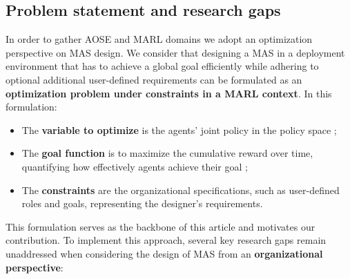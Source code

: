 \documentclass[pdflatex,sn-mathphys-num]{sn-jnl}%
\theoremstyle{thmstyleone}%
\theoremstyle{thmstyletwo}%
\theoremstyle{thmstylethree}%
\begin{document}

\subsection{Problem statement and research gaps}

In order to gather AOSE and MARL domains we adopt an optimization perspective on MAS design. We consider that designing a MAS in a deployment environment that has to achieve a global goal efficiently while adhering to optional additional user-defined requirements can be formulated as an \textbf{optimization problem under constraints in a MARL context}. In this formulation:
\begin{itemize}
    \item The \textbf{variable to optimize} is the agents' joint policy in the policy space ;
    \item The \textbf{goal function} is to maximize the cumulative reward over time, quantifying how effectively agents achieve their goal ;
    \item The \textbf{constraints} are the organizational specifications, such as user-defined roles and goals, representing the designer's requirements.
\end{itemize}
This formulation serves as the backbone of this article and motivates our contribution. 
%
To implement this approach, several key research gaps remain unaddressed when considering the design of MAS from an \textbf{organizational perspective}:
%
\end{document}
